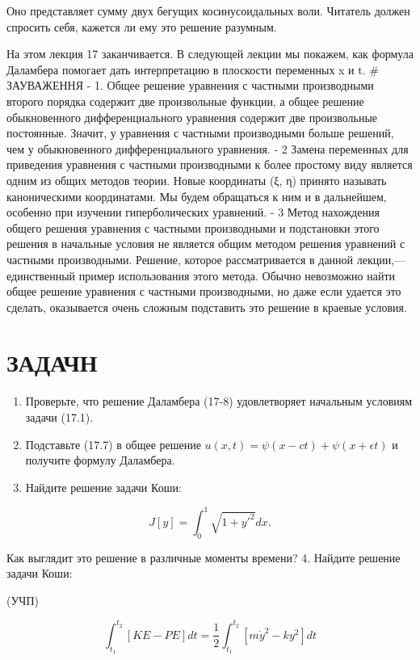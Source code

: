 \documentclass[
  ukrainian,
]{article}
\begin{document}
Оно представляет сумму двух бегущих косинусоидальных воли. Читатель
должен спросить себя, кажется ли ему это решение разумным.

На этом лекция 17 заканчивается. В следующей лекции мы покажем, как
формула Даламбера помогает дать интерпретацию в плоскости переменных x и
t. \# ЗАУВАЖЕННЯ - 1. Общее решение уравнения с частными производными
второго порядка содержит две произвольные функции, а общее решение
обыкновенного дифференциального уравнения содержит две произвольные
постоянные. Значит, у уравнения с частными производными больше решений,
чем у обыкновенного дифференциального уравнения. - 2 Замена переменных
для приведения уравнения с частными производными к более простому виду
является одним из общих методов теории. Новые координаты (ξ, η) принято
называть каноническими координатами. Мы будем обращаться к ним и в
дальнейшем, особенно при изучении гиперболических уравнений. - 3 Метод
нахождения общего решения уравнения с частными производными и
подстановки этого решения в начальные условия не является общим методом
решения уравнений с частными производными. Решение, которое
рассматривается в данной лекции,--- единственный пример использования
этого метода. Обычно невозможно найти общее решение уравнения с частными
производными, но даже если удается это сделать, оказывается очень
сложным подставить это решение в краевые условия.

\section{ЗАДАЧН}\label{ux437ux430ux434ux430ux447ux43d}

\begin{enumerate}
\def\labelenumi{\arabic{enumi}.}
\item
  Проверьте, что решение Даламбера (17-8) удовлетворяет начальным
  условиям задачи (17.1).
\item
  Подставьте (17.7) в общее решение
  \(u(x, t) = \psi(x - ct) + \psi(x + \epsilon t)\) и получите формулу
  Даламбера.
\item
  Найдите решение задачи Коши:
\end{enumerate}

\[
J[y] = \int_{0}^{1} \sqrt{1 + y'^{2}} dx.
\]

Как выглядит это решение в различные моменты времени? 4. Найдите решение
задачи Коши:

(УЧП)

\[
\int_{t_{1}}^{t_{2}} [KE - PE] dt = \frac{1}{2} \int_{t_{1}}^{t_{2}} [m\dot{y}^{2} - ky^{2}] dt
\]
\end{document}
